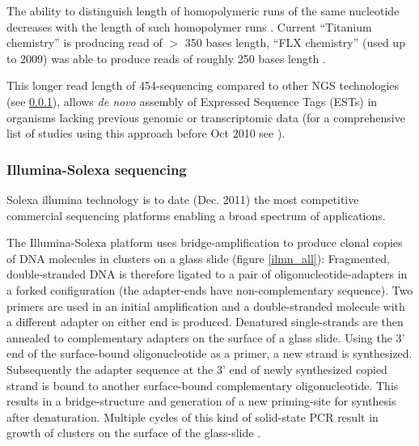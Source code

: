The ability to distinguish length of homopolymeric runs of the same
nucleotide decreases with the length of such homopolymer runs
\cite{pmid21685085}. Current ``Titanium chemistry'' is producing read
of $>$ 350 bases length, ``FLX chemistry'' (used up to 2009) was able
to produce reads of roughly 250 bases length \cite{pmid21514329}.

This longer read length of 454-sequencing \cite{pmid16056220} compared
to other NGS technologies (see \ref{sec:ill-seq}), allows \textit{de
  novo} assembly of Expressed Sequence Tags (ESTs) in organisms
lacking previous genomic or transcriptomic data (for a comprehensive
list of studies using this approach before Oct 2010 see
\cite{pmid20950480}).

\subsubsection{Illumina-Solexa sequencing}
\label{sec:ill-seq}

Solexa illumina technology is to date (Dec. 2011) the most competitive
commercial sequencing platforms enabling a broad spectrum of
applications.


The Illumina-Solexa platform uses bridge-amplification to produce
clonal copies of DNA molecules in clusters on a glass slide (figure
\ref{ilmn_all}): Fragmented, double-stranded DNA is therefore ligated to
a pair of oligonucleotide-adapters in a forked configuration (the
adapter-ends have non-complementary sequence). Two primers are used in
an initial amplification and a double-stranded molecule with a
different adapter on either end is produced. Denatured single-strands
are then annealed to complementary adapters on the surface of a glass
slide. Using the 3' end of the surface-bound oligonucleotide as a
primer, a new strand is synthesized. Subsequently the adapter sequence
at the 3' end of newly synthesized copied strand is bound to another
surface-bound complementary oligonucleotide. This results in a
bridge-structure and generation of a new priming-site for synthesis
after denaturation. Multiple cycles of this kind of solid-state PCR
result in growth of clusters on the surface of the glass-slide
\cite{pmid18987734}.

